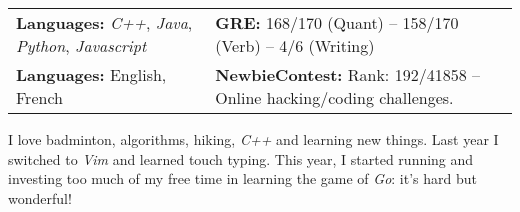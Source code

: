 \documentclass[a4paper, 12pt]{article}
\newcommand{\marginmisc}{0.3cm}
\begin{document}
\begin{footnotesize}
\noindent\begin{tabular}{@{}p{7cm}p{12cm}}
  \textbf{Languages:} \textit{C++}, \textit{Java}, \textit{Python}, \textit{Javascript} & \textbf{GRE:} 168/170 (Quant) -- 158/170 (Verb) -- 4/6 (Writing)\\
  \textbf{Languages:} English, French & \textbf{NewbieContest:} Rank: 192/41858 -- Online hacking/coding challenges.\\
\end{tabular}

\vspace{\marginmisc}

\renewcommand{\baselinestretch}{0.8}
I love badminton, algorithms, hiking, \textit{C++} and learning new things. Last year I switched to \textit{Vim} and learned touch typing. This year, I started running and investing too much of my free time in learning the game of \textit{Go}: it's hard but wonderful!

\end{footnotesize}
\end{document}
